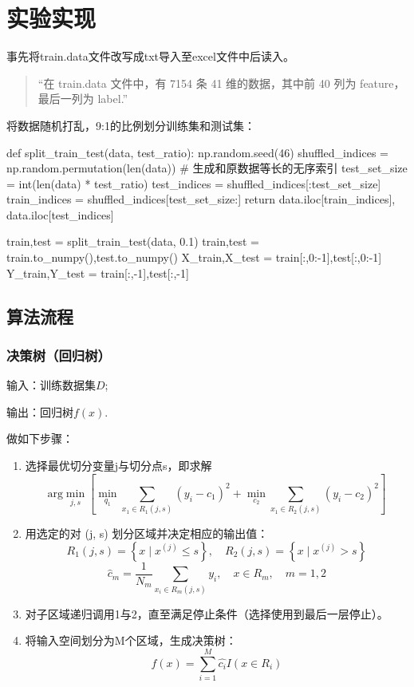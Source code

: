 \documentclass[UTF8,a4paper,AutoFakeBold,AutoFakeSlant]{article}
\begin{document}


\section{实验实现}

事先将train.data文件改写成txt导入至excel文件中后读入。
\begin{quote}
  “在 train.data 文件中，有 7154 条 41 维的数据，其中前 40 列为 feature，最后一列为 label.”
\end{quote}

将数据随机打乱，9:1的比例划分训练集和测试集：
\begin{python}
  def split_train_test(data, test_ratio):
    np.random.seed(46)
    shuffled_indices = np.random.permutation(len(data))  # 生成和原数据等长的无序索引
    test_set_size = int(len(data) * test_ratio)
    test_indices = shuffled_indices[:test_set_size]
    train_indices = shuffled_indices[test_set_size:]
    return data.iloc[train_indices], data.iloc[test_indices]

  train,test = split_train_test(data, 0.1)
  train,test = train.to_numpy(),test.to_numpy()
  X_train,X_test = train[:,0:-1],test[:,0:-1]
  Y_train,Y_test = train[:,-1],test[:,-1]
\end{python}

\subsection{算法流程}

\subsubsection{决策树（回归树）}
输入：训练数据集$D$;

输出：回归树$f(x)$.

做如下步骤：
\begin{enumerate}
  \item 选择最优切分变量j与切分点s，即求解$$ \text{arg}\min _{j, s}\left[\min _{q_{1}} \sum_{x_{1} \in R_{1}(j, s)}\left(y_{i}-c_{1}\right)^{2}+\min _{c_{2}} \sum_{x_{1} \in R_{2}(j, s)}\left(y_{i}-c_{2}\right)^{2}\right] $$
  \item 用选定的对 (j, s) 划分区域并决定相应的输出值：$$ R_{1}(j, s)=\left\{x \mid x^{(j)} \leq s\right\}, \quad R_{2}(j, s)=\left\{x \mid x^{(j)}>s\right\} $$ $$ \hat{c}_{m}=\frac{1}{N_{m}} \sum_{x_{i} \in R_{m}(j, s)} y_{i}, \quad x \in R_{m}, \quad m=1,2 $$
  \item 对子区域递归调用1与2，直至满足停止条件（选择使用到最后一层停止）。
  \item 将输入空间划分为M个区域，生成决策树：$$ f(x)=\sum_{i=1}^{M} \hat{c_{i}} I\left(x \in R_{i}\right) $$
\end{enumerate}
\end{document}
